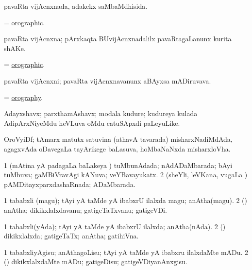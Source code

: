 \bentry
{}
\gl{\gu}
\bmng
pavaRta vijAcnxnada, adakekx saMbaMdhisida. 
\emng
\eentry

\bentry
{}
\gl{\gu}
\bmng
= \hyperlink{orographic}{orographic}. 
\emng
\eentry

\bentry
{}
\gl{\nA}
\bmng
pavaRta vijAcnxna; pArxkaqta BUvijAcnxnadalilx pavaRtagaLanunx kurita shAKe. 
\emng
\eentry

\bentry
{}
\gl{\gu}
\bmng
= \hyperlink{orographic}{orographic}. 
\emng
\eentry

\bentry
{}
\gl{\nA}
\bmng
pavaRta vijAcnxni; pavaRta vijAcnxnavanunx aBAyxsa mADiruvava. 
\emng
\eentry

\bentry
{}
\gl{\nA}
\bmng
= \hyperlink{orography}{orography}. 
\emng
\eentry

\bentry
{}
\gl{\nA}
\bmng
Adayxshavx; parxthamAshavx; modala kudure; kudureya kulada AdipArxNiyeMdu heVLuva oMdu catuSApxdi paLeyuLike. 
\emng
\eentry

\bentry
{}
\gl{\nA}
\bmng
OroVyiDf; tAmarx matutx satuvina (athavA tavarada) misharxNadiMdAda, agagxvAda oDavegaLa tayArikege baLasuva, hoMbaNaNxda misharxloVha. 
\emng
\eentry

\bentry
{}
\gl{\gu}
\bmng
\bnum
\num{1} (mAtina yA padagaLa baLakeya \vi) tuMbunAdada; nAdADaMbarada; bAyi tuMbuva; gaMBiVravAgi kANuva; veYBavayukatx. 
\num{2} (sheYli, leVKana, \mo vugaLa \vi) pAMDitayxparxdashaRnada; ADaMbarada. 
\enum
\emng
\eentry

\bentry
{}
\gl{\nA}
\bmng
\bnum
\num{1} tababxli (magu); tAyi yA taMde yA ibabxrU ilalxda magu; anAtha(magu). 
\num{2} (\rUpa) anAtha; dikikxlalxdavanu; gatigeTaTxvanu; gatigeVDi. 
\enum
\emng
\eentry

\bentry
{}
\gl{\gu}
\bmng
\bnum
\num{1} tababxli(yAda); tAyi yA taMde yA ibabxrU ilalxda; anAtha(nAda). 
\num{2} (\rUpa) dikikxlalxda; gatigeTaTx; anAtha; gatihiVna. 
\enum
\emng
\eentry

\bentry
{}
\gl{\sakirx}
\bmng
\bnum
\num{1} tababxliyAgisu; anAthagoLisu; tAyi yA taMde yA ibabxru ilalxdaMte mADu. 
\num{2} (\rUpa) dikikxlalxdaMte mADu; gatigeDisu; gatigeVDiyanAnxgisu. 
\enum
\emng
\eentry


